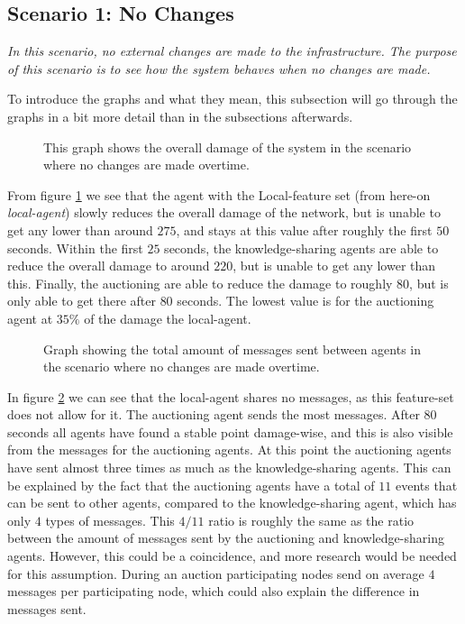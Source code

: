 \subsection{Scenario 1: No Changes}
\textit{In this scenario, no external changes are made to the infrastructure. The purpose of this scenario is to see how the system behaves when no changes are made.}

To introduce the graphs and what they mean, this subsection will go through the graphs in a bit more detail than in the subsections afterwards. 

\begin{figure}[H]
    \centering
    
    \caption{This graph shows the overall damage of the system in the scenario where no changes are made overtime.}
    \label{fig:overall-damage-no-change}
\end{figure}

From figure \ref{fig:overall-damage-no-change} we see that the agent with the Local-feature set (from here-on \textit{local-agent}) slowly reduces the overall damage of the network, but is unable to get any lower than around $275$, and stays at this value after roughly the first $50$ seconds.
Within the first $25$ seconds, the knowledge-sharing agents are able to reduce the overall damage to around $220$, but is unable to get any lower than this. 
Finally, the auctioning are able to reduce the damage to roughly $80$, but is only able to get there after $80$ seconds.
The lowest value is for the auctioning agent at $35\%$ of the damage the local-agent.

\begin{figure}[H]
    \centering
    
    \caption{Graph showing the total amount of messages sent between agents in the scenario where no changes are made overtime.}
    \label{fig:messages-no-change}
\end{figure}

In figure \ref{fig:messages-no-change} we can see that the local-agent shares no messages, as this feature-set does not allow for it. The auctioning agent sends the most messages. After $80$ seconds all agents have found a stable point damage-wise, and this is also visible from the messages for the auctioning agents. At this point the auctioning agents have sent almost three times as much as the knowledge-sharing agents. This can be explained by the fact that the auctioning agents have a total of $11$ events that can be sent to other agents, compared to the knowledge-sharing agent, which has only $4$ types of messages. This $4 / 11$ ratio is roughly the same as the ratio between the amount of messages sent by the auctioning and knowledge-sharing agents. However, this could be a coincidence, and more research would be needed for this assumption. During an auction participating nodes send on average $4$ messages per participating node, which could also explain the difference in messages sent. 

